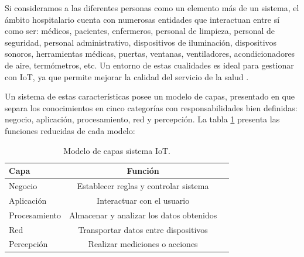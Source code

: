 Si consideramos a las diferentes personas como un elemento más de un sistema, el ámbito hospitalario cuenta con numerosas entidades que interactuan entre sí como ser: médicos, pacientes, enfermeros, personal de limpieza, personal de seguridad, personal administrativo, dispositivos de iluminación, dispositivos   sonoros, herramientas médicas, puertas, ventanas, ventiladores, acondicionadores de aire, termómetros, etc. Un entorno de estas cualidades es ideal para gestionar con IoT, ya que permite mejorar la calidad del servicio de la salud \citep{ARTICLE:1}.

Un sistema de estas características posee un modelo de capas, presentado en \citep{ARTICLE:4} que separa los conocimientos en cinco categorías con responsabilidades bien definidas: negocio, aplicación, procesamiento, red y percepción. La tabla \ref{tab:Modelo} presenta las funciones reducidas de cada modelo:
\pagebreak

\begin{table}[h]
	\centering
	\caption[Modelo de capas IoT]{Modelo de capas sistema IoT.}
	\begin{tabular}{l c c}    
		\toprule
		\textbf{Capa}     & \textbf{Función} \\
		\midrule
		Negocio & Establecer reglas y controlar sistema    \\		
		Aplicación    & Interactuar con el usuario           \\
		Procesamiento  & Almacenar y analizar los datos obtenidos  \\
		Red  & Transportar datos entre dispositivos      \\
		Percepción \citep{ARTICLE:4}  & Realizar mediciones o acciones\\
		\bottomrule
		\hline
	\end{tabular}
	\label{tab:Modelo}
\end{table}






